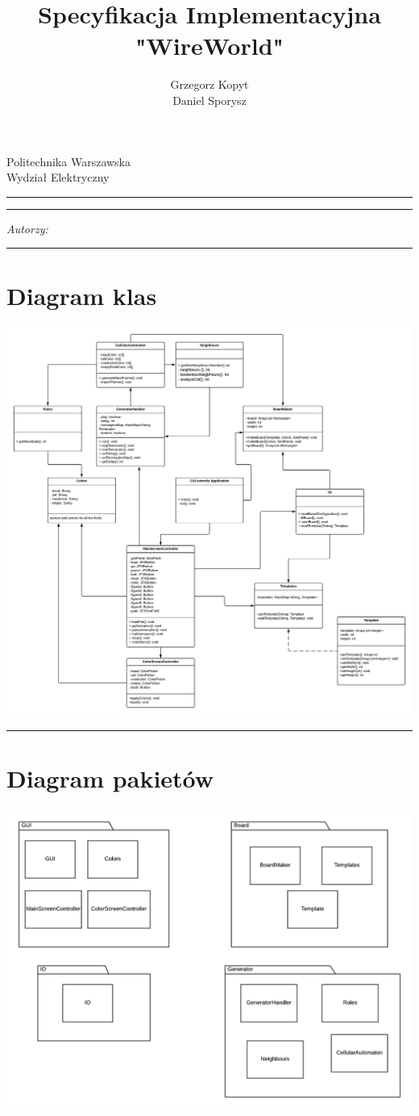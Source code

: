 \documentclass[a4paper,11pt]{article}
\author{Grzegorz Kopyt\\
Daniel Sporysz}
\title{Specyfikacja Implementacyjna \\
"WireWorld"}
\makeatletter
\newcommand{\linia}{\rule{\linewidth}{0.4mm}}
\renewcommand{\maketitle}{\begin{titlepage}
    \vspace*{2cm}
    \begin{center}\LARGE
    Politechnika Warszawska\\
    Wydział Elektryczny\\
    \end{center}
    \vspace{5cm}
    \noindent\linia
    \begin{center}
      \LARGE \textsc{\@title}
         \end{center}
     \linia
    \vspace{0.5cm}
    \begin{flushright}
    \begin{minipage}{5cm}
    \textit{Autorzy:}\\
    \normalsize \textsc{\@author} \par
    \end{minipage}
    \vspace{5cm}
     \end{flushright}
    \vspace*{\stretch{6}}
    \begin{center}
    \@date
    \end{center}
  \end{titlepage}%
}
\makeatother
\begin{document}
\maketitle


\tableofcontents
\vspace{1cm}
\noindent\linia





\section{Diagram klas}


\includegraphics[width=\textwidth]{DiagramKlas}

\noindent\linia


\section{Diagram pakietów}
\includegraphics[width=\textwidth]{DiagramPakiet}
\end{document}
